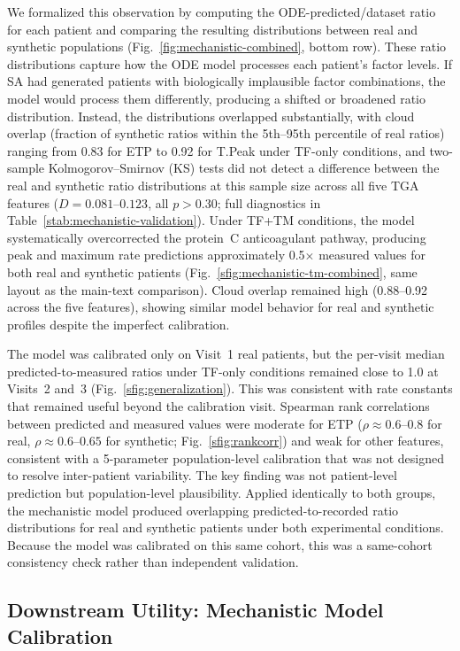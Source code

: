 We formalized this observation by computing the ODE-predicted/dataset ratio for each
patient and comparing the resulting distributions between real and synthetic
populations (Fig.~\ref{fig:mechanistic-combined}, bottom row). These ratio
distributions capture how the ODE model processes each patient's factor levels. If
SA had generated patients with biologically implausible factor combinations, the
model would process them differently, producing a shifted or broadened ratio
distribution. Instead, the distributions overlapped substantially, with cloud
overlap (fraction of synthetic ratios within the 5th--95th percentile of real
ratios) ranging from 0.83 for ETP to 0.92 for T.Peak under TF-only conditions,
and two-sample Kolmogorov--Smirnov (KS) tests did not detect a difference between
the real and synthetic ratio distributions at this sample size across all five TGA features
($D = 0.081$--$0.123$, all $p > 0.30$; full diagnostics in
Table~\ref{stab:mechanistic-validation}).
Under TF+TM conditions, the model systematically overcorrected the protein~C
anticoagulant pathway, producing peak and maximum rate predictions
approximately 0.5$\times$ measured values for both real and synthetic patients
(Fig.~\ref{sfig:mechanistic-tm-combined}, same layout as the main-text
comparison). Cloud overlap remained high (0.88--0.92 across the
five features), showing similar model behavior for real and synthetic profiles despite the
imperfect calibration.

The model was calibrated only on Visit~1 real patients, but the per-visit median predicted-to-measured
ratios under TF-only conditions remained close to 1.0 at Visits~2 and~3
(Fig.~\ref{sfig:generalization}). This was consistent with rate constants that remained useful
beyond the calibration visit. Spearman rank correlations between predicted and measured values were
moderate for ETP ($\rho \approx 0.6$--$0.8$ for real, $\rho \approx 0.6$--$0.65$
for synthetic; Fig.~\ref{sfig:rankcorr}) and weak for other features, consistent with
a 5-parameter population-level calibration that was not designed to resolve
inter-patient variability. The key finding was not patient-level prediction but
population-level plausibility. Applied identically to both groups, the mechanistic model
produced overlapping predicted-to-recorded ratio distributions for real and synthetic patients
under both experimental conditions. Because the model was calibrated on this same cohort, this
was a same-cohort consistency check rather than independent validation.

\subsection{Downstream Utility: Mechanistic Model Calibration}
\label{sec:results-utility}

